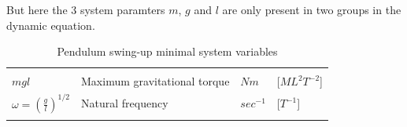 But here the 3 system paramters $m$, $g$ and $l$ are only present in two groups in the dynamic equation. 

\begin{table}[htb]
   \centering %
   \caption{Pendulum swing-up minimal system variables} 
   \label{expVari}
   \begin{tabular}{p{1.5cm} p{2.2cm} p{0.8cm} p{1.5cm} }
   \hline \hline \noalign{\smallskip} \noalign{\smallskip} 
   \multicolumn{4}{c}{\textbf{System parameters}}\\ \noalign{\smallskip}  \hline\hline  \noalign{\smallskip} 
   $mgl$ & Maximum gravitational torque  & $Nm$ & [$ML^2T^{-2}$]  \\ \noalign{\smallskip} \hline \noalign{\smallskip}
   $\omega = {(\frac{g}{l})}^{1/2}$ & Natural frequency & $sec^{-1}$ & [$T^{-1}$]  \\ \noalign{\smallskip} \hline \noalign{\smallskip}
   \hline \noalign{\smallskip}
   \end{tabular}
\end{table}









